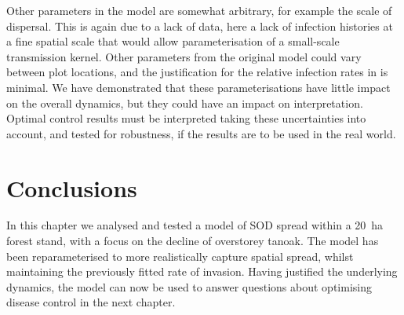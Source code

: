 Other parameters in the model are somewhat arbitrary, for example the scale of dispersal. This is again due to a lack of data, here a lack of infection histories at a fine spatial scale that would allow parameterisation of a small-scale transmission kernel. Other parameters from the original model could vary between plot locations, and the justification for the relative infection rates in \citet{cobb_ecosystem_2012} is minimal. We have demonstrated that these parameterisations have little impact on the overall dynamics, but they could have an impact on interpretation. Optimal control results must be interpreted taking these uncertainties into account, and tested for robustness, if the results are to be used in the real world.

\section{Conclusions\label{sec:ch5:conclusions}}

In this chapter we analysed and tested a model of SOD spread within a \SI{20}{\hectare} forest stand, with a focus on the decline of overstorey tanoak. The model has been reparameterised to more realistically capture spatial spread, whilst maintaining the previously fitted rate of invasion. Having justified the underlying dynamics, the model can now be used to answer questions about optimising disease control in the next chapter.